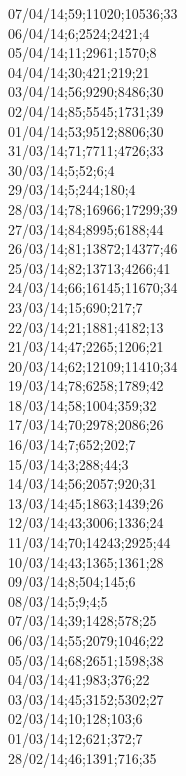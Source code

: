 07/04/14;59;11020;10536;33 \\
06/04/14;6;2524;2421;4 \\
05/04/14;11;2961;1570;8 \\
04/04/14;30;421;219;21 \\
03/04/14;56;9290;8486;30 \\
02/04/14;85;5545;1731;39 \\
01/04/14;53;9512;8806;30 \\
31/03/14;71;7711;4726;33 \\
30/03/14;5;52;6;4 \\
29/03/14;5;244;180;4 \\
28/03/14;78;16966;17299;39 \\
27/03/14;84;8995;6188;44 \\
26/03/14;81;13872;14377;46 \\
25/03/14;82;13713;4266;41 \\
24/03/14;66;16145;11670;34 \\
23/03/14;15;690;217;7 \\
22/03/14;21;1881;4182;13 \\
21/03/14;47;2265;1206;21 \\
20/03/14;62;12109;11410;34 \\
19/03/14;78;6258;1789;42 \\
18/03/14;58;1004;359;32 \\
17/03/14;70;2978;2086;26 \\
16/03/14;7;652;202;7 \\
15/03/14;3;288;44;3 \\
14/03/14;56;2057;920;31 \\
13/03/14;45;1863;1439;26 \\
12/03/14;43;3006;1336;24 \\
11/03/14;70;14243;2925;44 \\
10/03/14;43;1365;1361;28 \\
09/03/14;8;504;145;6 \\
08/03/14;5;9;4;5 \\
07/03/14;39;1428;578;25 \\
06/03/14;55;2079;1046;22 \\
05/03/14;68;2651;1598;38 \\
04/03/14;41;983;376;22 \\
03/03/14;45;3152;5302;27 \\
02/03/14;10;128;103;6 \\
01/03/14;12;621;372;7 \\
28/02/14;46;1391;716;35 \\
